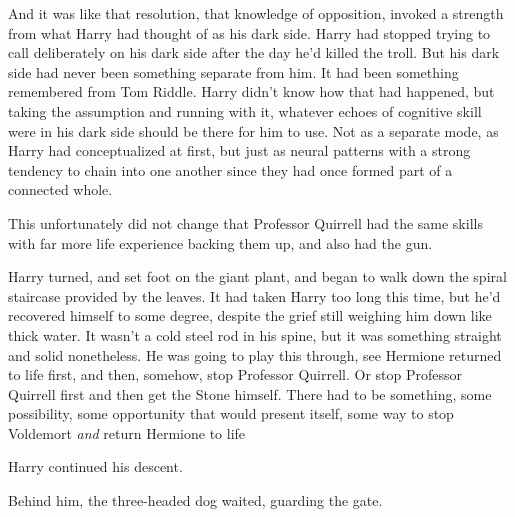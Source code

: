 And it was like that resolution, that knowledge of opposition, invoked a
strength from what Harry had thought of as his dark side. Harry had stopped
trying to call deliberately on his dark side after the day he'd killed the
troll. But his dark side had never been something separate from him. It had
been something remembered from Tom Riddle. Harry didn't know how that had
happened, but taking the assumption and running with it, whatever echoes of
cognitive skill were in his dark side should be there for him to use. Not as a
separate mode, as Harry had conceptualized at first, but just as neural
patterns with a strong tendency to chain into one another since they had once
formed part of a connected whole.

This unfortunately did not change that Professor Quirrell had the same skills
with far more life experience backing them up, and also had the gun.

Harry turned, and set foot on the giant plant, and began to walk down the
spiral staircase provided by the leaves. It had taken Harry too long this time,
but he'd recovered himself to some degree, despite the grief still weighing him
down like thick water. It wasn't a cold steel rod in his spine, but it was
something straight and solid nonetheless. He was going to play this through,
see Hermione returned to life first, and then, somehow, stop Professor
Quirrell. Or stop Professor Quirrell first and then get the Stone himself.
There had to be something, some possibility, some opportunity that would
present itself, some way to stop Voldemort \emph{and} return Hermione to
life{\el}

Harry continued his descent.

Behind him, the three-headed dog waited, guarding the gate.
